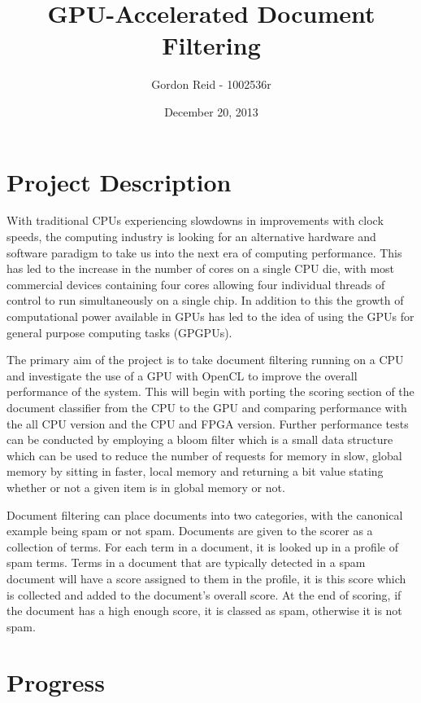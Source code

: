 \documentclass[11pt]{article}
\begin{document}
\title{GPU-Accelerated Document Filtering}
\author{Gordon Reid - 1002536r}
\date{December 20, 2013}
\maketitle

\section*{Project Description}

With traditional CPUs experiencing slowdowns in improvements with clock speeds,
the computing industry is looking for an alternative hardware and software
paradigm to take us into the next era of computing performance. This has led to
the increase in the number of cores on a single CPU die, with most commercial
devices containing four cores allowing four individual threads of control to
run simultaneously on a single chip. In addition to this the growth of
computational power available in GPUs has led to the idea of using the GPUs for
general purpose computing tasks (GPGPUs).

The primary aim of the project is to take document filtering running on a CPU
and investigate the use of a GPU with OpenCL to improve the overall performance
of the system. This will begin with porting the scoring section of the document
classifier from the CPU to the GPU and comparing performance with the all CPU
version and the CPU and FPGA version. Further performance tests can be
conducted by employing a bloom filter which is a small data structure which can
be used to reduce the number of requests for memory in slow, global memory by
sitting in faster, local memory and returning a bit value stating whether or
not a given item is in global memory or not.

Document filtering can place documents into two categories, with the canonical
example being spam or not spam. Documents are given to the scorer as a
collection of terms. For each term in a document, it is looked up in a profile
of spam terms. Terms in a document that are typically detected in a spam
document will have a score assigned to them in the profile, it is this score
which is collected and added to the document's overall score. At the end of
scoring, if the document has a high enough score, it is classed as spam,
otherwise it is not spam.

\section*{Progress}
\end{document}
